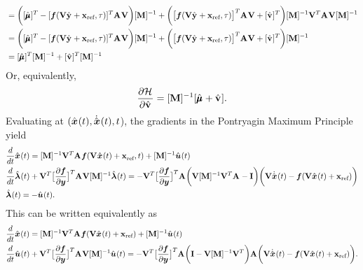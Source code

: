 \documentclass[3p,computermodern,10pt]{elsarticle}
\begin{document}
\begin{appendices}
\begin{align*}
& = \bigg( [\hat{\pmb \mu}^{}]^T - [\boldsymbol f(\mathbf {V} \hat{\mathbf{y}}^{} + \mathbf{x}_\text{ref},\tau) ]^T \mathbf{A}^{} \mathbf {V} \bigg) [\mathbf{M}]^{-1}  + \bigg(  \big[ \boldsymbol f(\mathbf {V} \hat{\mathbf{y}}^{} + \mathbf{x}_\text{ref},\tau) \big]^T \mathbf{A}^{} \mathbf {V} + [\hat{\mathbf{v}}^{}]^T   \bigg) [\mathbf{M}]^{-1}\mathbf {V}^T  \mathbf{A}^{} \mathbf {V} [\mathbf{M}]^{-1}  \\
& = \bigg( [\hat{\pmb \mu}^{}]^T - [\boldsymbol f(\mathbf {V} \hat{\mathbf{y}}^{} + \mathbf{x}_\text{ref},\tau) ]^T \mathbf{A}^{} \mathbf {V} \bigg) [\mathbf{M}]^{-1}  + \bigg(  \big[ \boldsymbol f(\mathbf {V} \hat{\mathbf{y}}^{} + \mathbf{x}_\text{ref},\tau) \big]^T \mathbf{A}^{} \mathbf {V} + [\hat{\mathbf{v}}^{}]^T   \bigg) [\mathbf{M}]^{-1}  \\
& =  [\hat{\pmb \mu}^{}]^T  [\mathbf{M}]^{-1}  +  [\hat{\mathbf{v}}^{}]^T   [\mathbf{M}]^{-1}  
\end{align*}
Or, equivalently,
\begin{equation*}
\frac{\partial \mathcal{H}^{}}{\partial \hat{\mathbf{v}}^{}} = 
  [\mathbf{M}]^{-1} [\hat{\pmb \mu}^{} +  \hat{\mathbf{v}}^{}]. 
\end{equation*}
Evaluating at $(\hat{ \boldsymbol x}^{}(t),\dot{\hat{ \boldsymbol x}}^{}(t),t$), the gradients in the Pontryagin Maximum Principle yield
\begin{align*}%
&\frac{d}{dt}\genstateArg{}{t} =  [\massArgnt{}]^{-1}\basisspace^T \stweightingMatArg{}\velocity(\veloargsrom) + [\massArgnt{}]^{-1}\controllerArg{}{t}\\ 
&\frac{d }{dt} \adjointArg{}{t}  + \basisspace^T \big[  \frac{\partial \velocity}{\partial \statey} \big]^T \stweightingMatArg{}  \basisspace [\massArgnt{}]^{-1}  \adjointArg{}{t} = 
 - \basisspace^T \big[  \frac{\partial \velocity}{\partial \statey} \big]^T \stweightingMatArg{} 
\bigg(  \basisspace  [\massArgnt{}]^{-1}\basisspace^T \stweightingMatArg{} - \mathbf{I} \bigg)
 \bigg( \basisspace \genstateDotArg{}{t} - \velocity(\basisspace \genstateArg{}{t} + \stateIntercept) \bigg) \\ 
& \adjointArg{}{t}= -\controllerArg{}{t}.
\end{align*}
This can be written equivalently as
\begin{align*}%
&\frac{d}{dt}\genstateArg{}{t} =  [\massArgnt{}]^{-1}\basisspace^T \stweightingMatArg{}\velocity(\basisspace \genstateArg{}{t} + \stateIntercept) + [\massArgnt{}]^{-1}\controllerArg{}{t} \\ 
&\frac{d}{dt} \controllerArg{}{t}  + \basisspace^T \big[  \frac{\partial \velocity}{\partial \statey} \big]^T \stweightingMatArg{}  \basisspace [\massArgnt{}]^{-1}  \controllerArg{}{t} = 
 - \basisspace^T \big[  \frac{\partial \velocity}{\partial \statey} \big]^T \stweightingMatArg{} 
\bigg( \mathbf{I} -   \basisspace  [\massArgnt{}]^{-1}\basisspace^T \bigg)
\stweightingMatArg{} \bigg( \basisspace \genstateDotArg{}{t} - \velocity(\basisspace \genstateArg{}{t} + \stateIntercept) \bigg). 
\end{align*}



\end{appendices}
\end{document}
